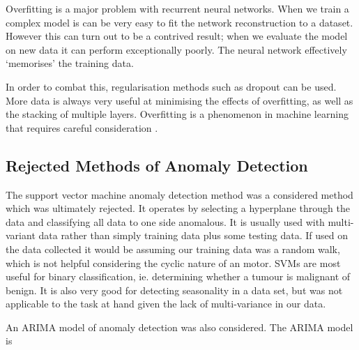 Overfitting is a major problem with recurrent neural networks. When we train a complex model is can be very easy to fit the network reconstruction to a dataset. However this can turn out to be a contrived result; when we evaluate the model on new data it can perform exceptionally poorly. The neural network effectively `memorises' the training data.

In order to combat this, regularisation methods such as dropout can be used. More data is always very useful at minimising the effects of overfitting, as well as the stacking of multiple layers. Overfitting is a phenomenon in machine learning that requires careful consideration \cite{DBLP:journals/corr/LiptonKEW15}.

\subsection{Rejected Methods of Anomaly Detection}
The support vector machine anomaly detection method was a considered method which was ultimately rejected. It operates by selecting a hyperplane through the data and classifying all data to one side anomalous. It is usually used with multi-variant data rather than simply training data plus some testing data. If used on the data collected it would be assuming our training data was a random walk, which is not helpful considering the cyclic nature of an motor. SVMs are most useful for binary classification, ie. determining whether a tumour is malignant of benign. It is also very good for detecting seasonality in a data set, but was not applicable to the task at hand given the lack of multi-variance in our data.

An ARIMA model of anomaly detection was also considered. The ARIMA model is 
